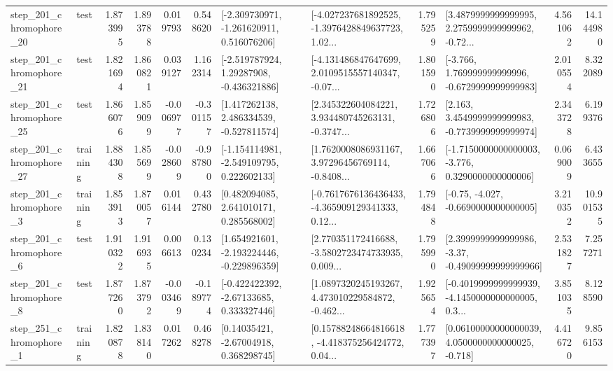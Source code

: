 \begin{tabular}{llrrrrllrlrr}
  step\_201\_chromophore\_20 &      test &      1.873995 &    1.893788 &      0.019793 &  0.548620 &   [-2.309730971, -1.261620911, 0.516076206] &  [-4.027237681892525, -1.3976428849637723, 1.02... &       1.795259 &  [3.4879999999999995, 2.2759999999999962, -0.72... &            4.561062 &         14.144980 \\
  step\_201\_chromophore\_21 &      test &      1.821694 &    1.860821 &      0.039127 &  1.162314 &    [-2.519787924, 1.29287908, -0.436321886] &  [-4.131486847647699, 2.0109515557140347, -0.07... &       1.801590 &   [-3.766, 1.769999999999996, -0.6729999999999983] &            2.010554 &          8.322089 \\
  step\_201\_chromophore\_25 &      test &      1.866076 &    1.859099 &     -0.006977 & -0.301157 &    [1.417262138, 2.486334539, -0.527811574] &  [2.345322604084221, 3.934480745263131, -0.3747... &       1.726806 &   [2.163, 3.4549999999999983, -0.7739999999999974] &            2.343728 &          6.199376 \\
  step\_201\_chromophore\_27 &  training &      1.884308 &    1.855699 &     -0.028609 & -0.987800 &   [-1.154114981, -2.549109795, 0.222602133] &  [1.7620008086931167, 3.97296456769114, -0.8408... &       1.667066 &  [-1.7150000000000003, -3.776, 0.3290000000000006] &            0.069009 &          6.433655 \\
   step\_201\_chromophore\_3 &  training &      1.853913 &    1.870057 &      0.016144 &  0.432780 &     [0.482094085, 2.641010171, 0.285568002] &  [-0.7617676136436433, -4.365909129341333, 0.12... &       1.794848 &               [-0.75, -4.027, -0.6690000000000005] &            3.210352 &         10.901535 \\
   step\_201\_chromophore\_6 &      test &      1.910322 &    1.916935 &      0.006613 &  0.130234 &   [1.654921601, -2.193224446, -0.229896359] &  [2.770351172416688, -3.5802723474733935, 0.009... &       1.795990 &  [2.3999999999999986, -3.37, -0.49099999999999966] &            2.531827 &          7.257271 \\
   step\_201\_chromophore\_8 &      test &      1.877260 &    1.873792 &     -0.003469 & -0.189774 &    [-0.422422392, -2.67133685, 0.333327446] &  [1.0897320245193267, 4.473010229584872, -0.462... &       1.925654 &  [-0.4019999999999939, -4.1450000000000005, 0.3... &            3.851035 &          8.128590 \\
   step\_251\_chromophore\_1 &  training &      1.820878 &    1.838140 &      0.017262 &  0.468278 &      [0.14035421, -2.67004918, 0.368298745] &  [0.15788248664816618, -4.418375256424772, 0.04... &       1.777397 &  [0.06100000000000039, 4.0500000000000025, -0.718] &            4.416720 &          9.856153 \\

\end{tabular}
